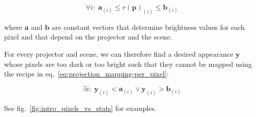 \begin{equation}
    \label{eq:projection_mapping-limitations}
    \forall i:\; \bm{a}_{(i)} \leq r(\bm{p})_{(i)} \leq \bm{b}_{(i)}
\end{equation}

where \(\bm{a}\) and \(\bm{b}\) are constant vectors that determine brightness values for each pixel and that depend on the projector and the scene.

For every projector and scene, we can therefore find a desired appearance \(\bm{y}\) whose pixels are too dark or too bright such that they cannot be mapped using the recipe in eq.~\ref{eq:projection_mapping-per_pixel}:

\begin{equation}
    \label{eq:projection_mapping-hard_image}
    \exists i:\; \bm{y}_{(i)} < \bm{a}_{(i)} \lor \bm{y}_{(i)} > \bm{b}_{(i)}
\end{equation}

See fig.~\ref{fig:intro_pixels_vs_stats} for examples.

